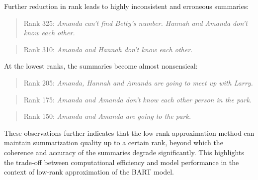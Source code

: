 Further reduction in rank leads to highly inconsistent and erroneous summaries:
\begin{quote}
    Rank 325: \textit{Amanda can't find Betty's number. Hannah and Amanda don't know each other.}
\end{quote}
\begin{quote}
    Rank 310: \textit{Amanda and Hannah don't know each other.}
\end{quote}

At the lowest ranks, the summaries become almost nonsensical:
\begin{quote}
    Rank 205: \textit{Amanda, Hannah and Amanda are going to meet up with Larry.}
\end{quote}
\begin{quote}
    Rank 175: \textit{Amanda and Amanda don't know each other person in the park.}
\end{quote}
\begin{quote}
    Rank 150: \textit{Amanda and Amanda are going to the park.}
\end{quote}

These observations further indicates that the low-rank approximation method can maintain summarization quality up to a certain rank, beyond which the coherence and accuracy of the summaries degrade significantly. This highlights the trade-off between computational efficiency and model performance in the context of low-rank approximation of the BART model.


